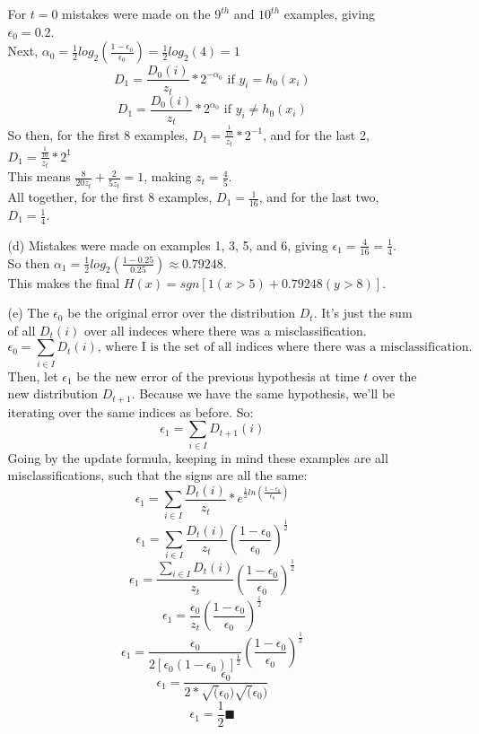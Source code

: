 \begin{enumerate}
\begin{enumerate}
      For $t=0$ mistakes were made on the $9^{th}$ and $10^{th}$ examples, giving $\epsilon_0 = 0.2$.\\
      Next, $\alpha_0 = \frac{1}{2}log_2(\frac{1-\epsilon_0}{\epsilon_0}) = \frac{1}{2}log_2(4) = 1$\\
      $$D_1 = \frac{D_0(i)}{z_t} * 2^{-\alpha_0} \text{ if } y_i = h_0(x_i)$$
      $$D_1 = \frac{D_0(i)}{z_t} * 2^{\alpha_0} \text{ if } y_i \neq h_0(x_i)$$
      So then, for the first 8 examples, $D_1 = \frac{\frac{1}{10}}{z_t} * 2^{-1}$, and for the last 2, $D_1 = \frac{\frac{1}{10}}{z_t} * 2^{1}$\\
      This means $\frac{8}{20z_t} + \frac{2}{5z_t} = 1$, making $z_t = \frac{4}{5}$.\\
      All together, for the first 8 examples, $D_1 = \frac{1}{16}$, and for the last two, $D_1 = \frac{1}{4}$.
    \item[(d)]
      Mistakes were made on examples 1, 3, 5, and 6, giving $\epsilon_1 = \frac{4}{16} = \frac{1}{4}$.\\
      So then $\alpha_1 = \frac{1}{2}log_2(\frac{1-0.25}{0.25}) \approx 0.79248$.\\
      This makes the final $H(x) = sgn[1(x>5) + 0.79248(y>8)]$.
    \item[(e)]
      The $\epsilon_0$ be the original error over the distribution $D_t$. It's just the sum of all $D_t(i)$ over all indeces where there was a misclassification.
      $$\epsilon_0 = \sum\limits_{i\in I} D_t(i) \text{, where I is the set of all indices where there was a misclassification.}$$
      Then, let $\epsilon_1$ be the new error of the previous hypothesis at time $t$ over the new distribution $D_{t+1}$. Because we have the same hypothesis, we'll be iterating over the same indices as before. So:
      $$\epsilon_1 = \sum\limits_{i\in I} D_{t+1}(i)$$
      Going by the update formula, keeping in mind these examples are all misclassifications, such that the signs are all the same:
      $$\epsilon_1 = \sum\limits_{i\in I} \frac{D_t(i)}{z_t} * e^{\frac{1}{2}ln(\frac{1-\epsilon_0}{\epsilon_0})}$$
      $$\epsilon_1 = \sum\limits_{i\in I} \frac{D_t(i)}{z_t}(\frac{1-\epsilon_0}{\epsilon_0})^{\frac{1}{2}}$$
      $$\epsilon_1 = \frac{\sum\limits_{i\in I} D_t(i)}{z_t}(\frac{1-\epsilon_0}{\epsilon_0})^{\frac{1}{2}}$$
      $$\epsilon_1 = \frac{\epsilon_0}{z_t}(\frac{1-\epsilon_0}{\epsilon_0})^{\frac{1}{2}}$$
      $$\epsilon_1 = \frac{\epsilon_0}{2[\epsilon_0(1-\epsilon_0)]^{\frac{1}{2}}}(\frac{1-\epsilon_0}{\epsilon_0})^{\frac{1}{2}}$$
      $$\epsilon_1 = \frac{\epsilon_0}{2 * \sqrt(\epsilon_0)\sqrt(\epsilon_0)}$$
      $$\epsilon_1 = \frac{1}{2} \blacksquare$$
      

\end{enumerate}
\end{enumerate}
